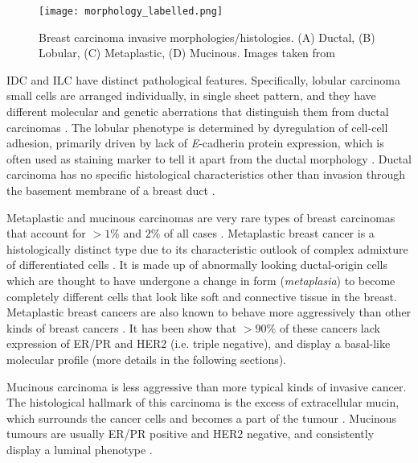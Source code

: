    
            \begin{figure}[!h]
            \centering
            \texttt{[image: morphology\_labelled.png]}
            \caption[Image of invasive breast carcinoma morphologies/histologies.]{Breast carcinoma invasive morphologies/histologies. (A) Ductal, (B) Lobular, (C) Metaplastic, (D) Mucinous. Images taken from \cite{Ramnani2016Webpathology.com:Images, Abdelmessieh2016BreastOverview}}
            \label{fig:histology}
            \end{figure} 
    
  IDC and ILC have distinct pathological features. Specifically, lobular carcinoma small cells are arranged individually, in single sheet pattern, and they have different molecular and genetic aberrations that distinguish them from ductal carcinomas \cite{weigelt2010molecular}. The lobular phenotype is determined by dyregulation of cell-cell adhesion, primarily driven by lack of \textit{E}-cadherin protein expression, which is often used as staining marker to tell it apart from the ductal morphology \cite{Abdelmessieh2016BreastOverview, Ciriello2015ComprehensiveCancer}. Ductal carcinoma has no specific histological characteristics other than invasion through the basement membrane of a breast duct \cite{Weigelt2008RefinementTypes}. 
   
    Metaplastic and mucinous carcinomas are very rare types of breast carcinomas that account for $>1\%$ and $2\%$ of all cases  \cite{Makki2015DiversityRelevance}. 
    Metaplastic breast cancer is a histologically distinct type due to its characteristic outlook of complex admixture of differentiated cells  \cite{Makki2015DiversityRelevance}. It is made up of abnormally looking ductal-origin cells which are thought to have undergone a change in form (\textit{metaplasia}) to become completely different cells that look like soft and connective tissue in the breast. Metaplastic breast cancers are also known to  behave more aggressively than other kinds of breast cancers \cite{schwartz2013metaplastic}. 
    It has been show that $>90\%$ of these cancers lack expression of ER/PR and HER2 (i.e. triple negative), and display a basal-like molecular profile \cite{Weigelt2010a} (more details in the following sections).


    Mucinous carcinoma is less aggressive than more typical kinds of invasive cancer. The histological hallmark of this carcinoma is the excess of extracellular mucin, which surrounds the cancer cells and becomes a part of the tumour \cite{dumitru2015mucinous}.  Mucinous tumours are usually ER/PR positive and HER2 negative, and consistently display a luminal phenotype \cite{Weigelt2010a}. 
    

